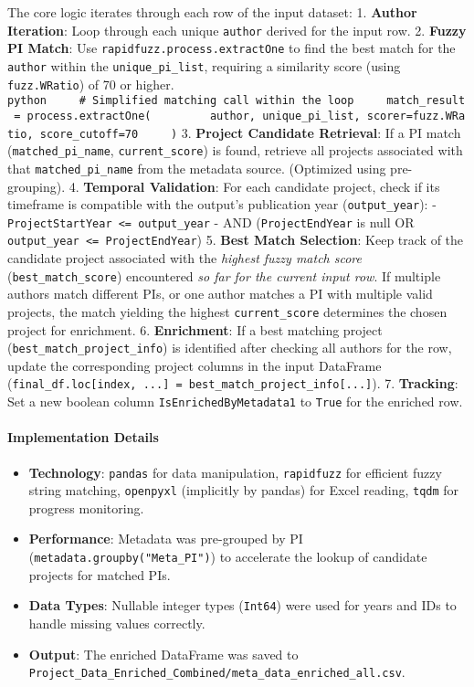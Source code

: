 \documentclass[12pt]{article}
\providecommand{\tightlist}{%
  \setlength{\itemsep}{0pt}\setlength{\parskip}{0pt}}
\begin{document}
The core logic iterates through each row of the input dataset: 1.
\textbf{Author Iteration}: Loop through each unique \texttt{author}
derived for the input row. 2. \textbf{Fuzzy PI Match}: Use
\texttt{rapidfuzz.process.extractOne} to find the best match for the
\texttt{author} within the \texttt{unique\_pi\_list}, requiring a
similarity score (using \texttt{fuzz.WRatio}) of 70 or higher.
\texttt{python\ \ \ \ \ \#\ Simplified\ matching\ call\ within\ the\ loop\ \ \ \ \ match\_result\ =\ process.extractOne(\ \ \ \ \ \ \ \ \ author,\ unique\_pi\_list,\ scorer=fuzz.WRatio,\ score\_cutoff=70\ \ \ \ \ )}
3. \textbf{Project Candidate Retrieval}: If a PI match
(\texttt{matched\_pi\_name}, \texttt{current\_score}) is found, retrieve
all projects associated with that \texttt{matched\_pi\_name} from the
metadata source. (Optimized using pre-grouping). 4. \textbf{Temporal
Validation}: For each candidate project, check if its timeframe is
compatible with the output's publication year (\texttt{output\_year}): -
\texttt{ProjectStartYear\ \textless{}=\ output\_year} - AND
(\texttt{ProjectEndYear} is null OR
\texttt{output\_year\ \textless{}=\ ProjectEndYear}) 5. \textbf{Best
Match Selection}: Keep track of the candidate project associated with
the \emph{highest fuzzy match score} (\texttt{best\_match\_score})
encountered \emph{so far for the current input row}. If multiple authors
match different PIs, or one author matches a PI with multiple valid
projects, the match yielding the highest \texttt{current\_score}
determines the chosen project for enrichment. 6. \textbf{Enrichment}: If
a best matching project (\texttt{best\_match\_project\_info}) is
identified after checking all authors for the row, update the
corresponding project columns in the input DataFrame
(\texttt{final\_df.loc{[}index,\ ...{]}\ =\ best\_match\_project\_info{[}...{]}}).
7. \textbf{Tracking}: Set a new boolean column
\texttt{IsEnrichedByMetadata1} to \texttt{True} for the enriched row.

\paragraph{Implementation
Details}\label{implementation-details-3}

\begin{itemize}
\tightlist
\item
  \textbf{Technology}: \texttt{pandas} for data manipulation,
  \texttt{rapidfuzz} for efficient fuzzy string matching,
  \texttt{openpyxl} (implicitly by pandas) for Excel reading,
  \texttt{tqdm} for progress monitoring.
\item
  \textbf{Performance}: Metadata was pre-grouped by PI
  (\texttt{metadata.groupby("Meta\_PI")}) to accelerate the lookup of
  candidate projects for matched PIs.
\item
  \textbf{Data Types}: Nullable integer types (\texttt{Int64}) were used
  for years and IDs to handle missing values correctly.
\item
  \textbf{Output}: The enriched DataFrame was saved to
  \texttt{Project\_Data\_Enriched\_Combined/meta\_data\_enriched\_all.csv}.
\end{itemize}
\end{document}
